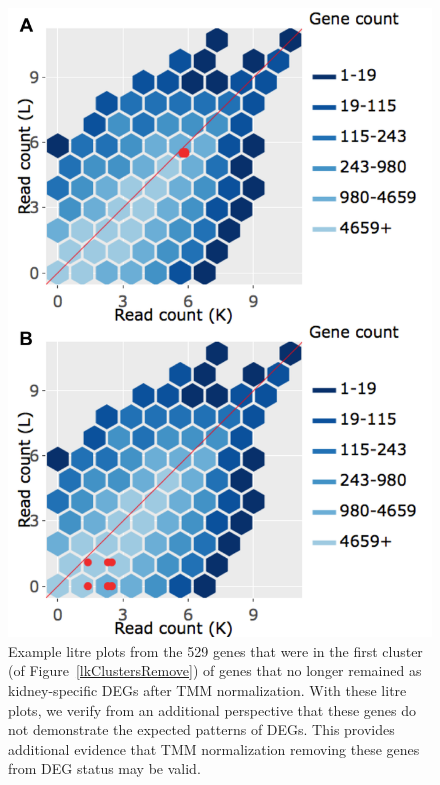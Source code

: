 \documentclass{article}
\begin{document}
\null
\begin{figure}[t!]
\centerline{\includegraphics[width=0.7\columnwidth]{../MakeFigures/Dashboards/litreClusterRemove/litreClusterRemove.jpg}}
\caption{Example litre plots from the 529 genes that were in the first cluster (of Figure~\ref{lkClustersRemove}) of genes that no longer remained as kidney-specific DEGs after TMM normalization. With these litre plots, we verify from an additional perspective that these genes do not demonstrate the expected patterns of DEGs. This provides additional evidence that TMM normalization removing these genes from DEG status may be valid.
\label{litreClusterRemove}}
\end{figure}
\end{document}
